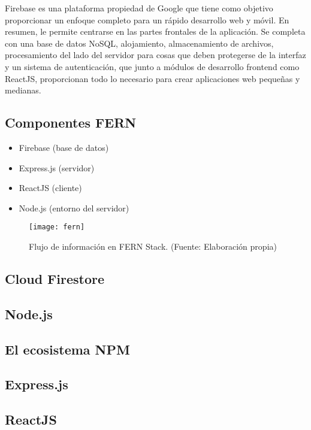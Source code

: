 Firebase es una plataforma propiedad de Google que tiene como objetivo proporcionar un enfoque completo para un rápido desarrollo web y móvil. En resumen, le permite centrarse en las partes frontales de la aplicación. Se completa con una base de datos NoSQL, alojamiento, almacenamiento de archivos, procesamiento del lado del servidor para cosas que deben protegerse de la interfaz y un sistema de autenticación, que junto a módulos de desarrollo \gls{frontend} como ReactJS, proporcionan todo lo necesario para crear aplicaciones web pequeñas y medianas.
\vspace{0.8cm}

\subsection{Componentes FERN}
\begin{itemize}
  \item Firebase (base de datos)
  \item Express.js (servidor)
  \item ReactJS (cliente)
  \item Node.js (entorno del servidor)
\end{itemize}
\begin{figure}[H]
  \centering
  \texttt{[image: fern]}
  \caption{Flujo de información en FERN Stack. (Fuente: Elaboración propia)}
\end{figure}

\subsection{Cloud Firestore}


\subsection{Node.js}


\subsection{El ecosistema NPM}


\subsection{Express.js}


\subsection{ReactJS}

